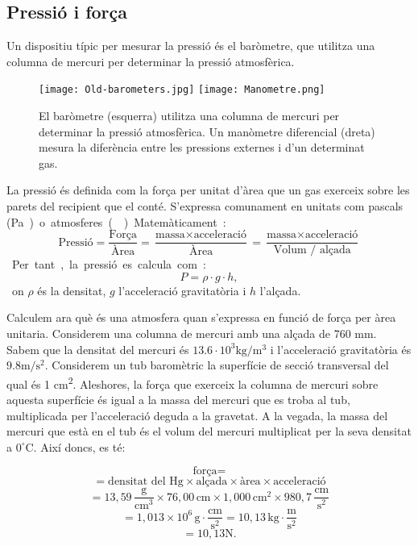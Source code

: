 \subsection{Pressió i força}

Un dispositiu típic per mesurar la pressió és el baròmetre, que utilitza una columna de mercuri per determinar la pressió atmosfèrica.

\begin{figure}[h]
    \centering
    \texttt{[image: Old-barometers.jpg]}
    \texttt{[image: Manometre.png]}
    \caption[Baròmetre i Manòmetre diferencial]{El baròmetre (esquerra) utilitza una columna de mercuri per determinar la pressió atmosfèrica. Un manòmetre diferencial (dreta) mesura la diferència entre les pressions externes i d'un determinat gas.}
    \label{fig:Manometre}
    \end{figure}

La pressió és definida com la força per unitat d'àrea que un gas exerceix sobre les parets del recipient que el conté. S'expressa comunament en unitats com pascals (\si\pascal) o atmosferes (\si\atm). Matemàticament:
\begin{equation}
\text{Pressió} = \frac{\text{Força}}{\text{Àrea}} = \frac{\text{massa} \times \text{acceleració}}{\text{Àrea}} = \frac{\text{massa} \times \text{acceleració}}{\text{Volum / alçada}} 
\end{equation}
Per tant, la pressió es calcula com:
\begin{equation}
P = \rho \cdot g \cdot h,
\end{equation}
on $\rho$ és la densitat, $g$ l'acceleració gravitatòria i $h$ l'alçada.

Calculem ara què és una atmosfera quan s'expressa en funció de força per àrea unitaria. Considerem una columna de mercuri amb una alçada de 760 mm. Sabem que la densitat del mercuri és $13.6 \cdot 10^3 \si{\kg\per\meter\tothe{3}}$ i l'acceleració gravitatòria és $9.8 \si{\meter\per\square\second}$.  Considerem un tub baromètric la superfície de secció transversal del qual és 1 \si{\square\cm}. Aleshores, la força que exerceix la columna de mercuri sobre aquesta superfície és igual a la massa del mercuri que es troba al tub, multiplicada per l'acceleració deguda a la gravetat. A la vegada, la massa del mercuri que està en el tub és el volum del mercuri multiplicat per la seva densitat a $0^{\circ}\text{C}$. Així doncs, es té:

\[
\text{força} = 
\]
\[
= \text{densitat del Hg} \times \text{alçada} \times \text{àrea} \times \text{acceleració}
\]
\[
= 13,59 \, \frac{\si\g}{\si{\cubic\cm}} \times 76,00 \, \si{\cm} \times 1,000 \, \si{\square\cm} \times 980,7 \, \frac{\si{\cm}}{\si{\s}^2}
\]
\[
= 1,013 \times 10^6 \, \si\g \cdot \frac{\si\cm}{\si{\s}^2} = 10,13 \, \si\kg \cdot \frac{\si\m}{\si{\s^2}}
\]
\[
= 10,13 \si{\newton}.
\]

